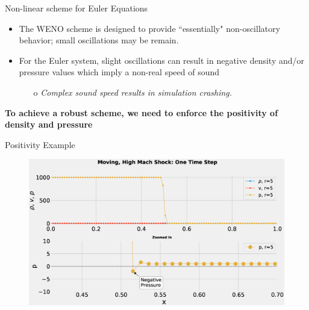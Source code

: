\documentclass[10pt]{beamer}
\begin{document}
\begin{frame}{Non-linear scheme for Euler Equations}
  \begin{itemize}
    \item The WENO scheme is designed to provide ``essentially" non-oscillatory behavior; small oscillations may be remain.
    \item For the Euler system, slight oscillations can result in negative density and/or pressure values which imply a non-real speed of sound
    \begin{itemize}
      \item[o] \textit{Complex sound speed results in simulation crashing.}
    \end{itemize}  
  \end{itemize}
  \textbf{To achieve a robust scheme, we need to enforce the positivity of density and pressure}
\end{frame}

\begin{frame}{Positivity Example}
  \begin{figure}[H]
    \centering
    \includegraphics[scale=0.275]{PositivityZoom.eps}
    \end{figure}
\end{frame}


\end{document}
